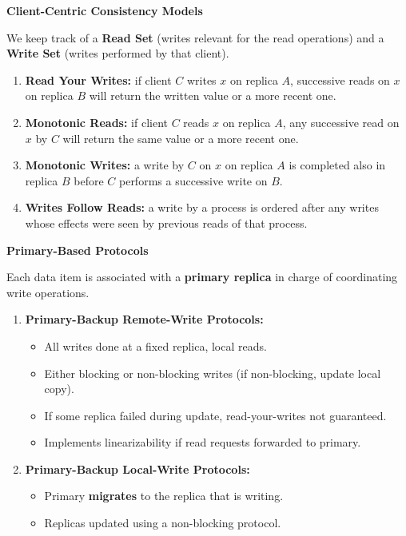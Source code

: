\documentclass[a4paper, 10pt, twocolumn]{article}
\begin{document}
    \textbf{Client-Centric Consistency Models}

    We keep track of a \textbf{Read Set} (writes relevant for the read operations) and a \textbf{Write Set} (writes performed by that client).
    \begin{enumerate}
        \item \textbf{Read Your Writes:} if client $C$ writes $x$ on replica $A$, successive reads on $x$ on replica $B$ will return the written value or a more recent one.
        \item \textbf{Monotonic Reads:} if client $C$ reads $x$ on replica $A$, any successive read on $x$ by $C$ will return the same value or a more recent one.
        \item \textbf{Monotonic Writes:} a write by $C$ on $x$ on replica $A$ is completed also in replica $B$ before $C$ performs a successive write on $B$.
        \item \textbf{Writes Follow Reads:} a write by a process is ordered after any writes whose effects were seen by previous reads of that process.
    \end{enumerate}

    \textbf{Primary-Based Protocols}

    Each data item is associated with a \textbf{primary replica} in charge of coordinating write operations.
    \begin{enumerate}
        \item \textbf{Primary-Backup Remote-Write Protocols:}
        \begin{itemize}
            \item All writes done at a fixed replica, local reads.
            \item Either blocking or non-blocking writes (if non-blocking, update local copy).
            \item If some replica failed during update, read-your-writes not guaranteed.
            \item Implements linearizability if read requests forwarded to primary.
        \end{itemize}
        \item \textbf{Primary-Backup Local-Write Protocols:}
        \begin{itemize}
            \item Primary \textbf{migrates} to the replica that is writing.
            \item Replicas updated using a non-blocking protocol.
        \end{itemize}
    \end{enumerate}
\end{document}
